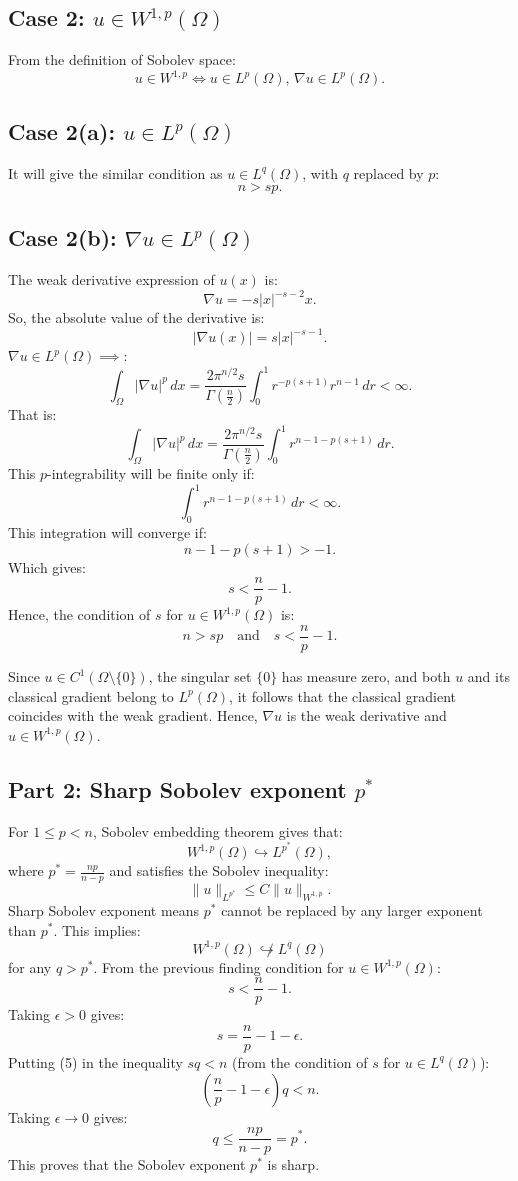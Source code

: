 \subsection{Case 2: $u\in W^{1,p}(\Omega)$}

From the definition of Sobolev space:
\[
u\in W^{1,p} \iff u\in L^p(\Omega), \, \nabla u\in L^p(\Omega).
\]

\subsection*{Case 2(a): $u\in L^p(\Omega)$}
It will give the similar condition as $u\in L^q(\Omega)$, with $q$ replaced by $p$:
\[
\boxed{
n>sp.
}
\]

\subsection*{Case 2(b): $\nabla u\in L^p(\Omega)$}
The weak derivative expression of $u(x)$ is:
\[
\nabla u = -s|x|^{-s-2}x.
\]
So, the absolute value of the derivative is:
\begin{equation}
    |\nabla u(x)| = s|x|^{-s-1}.
\end{equation}
$\nabla u\in L^p(\Omega) \implies$:
\[
\int_\Omega |\nabla u|^p \, dx = \frac{2\pi^{n/2}s}{\Gamma(\frac{n}{2})} \int_0^1 r^{-p(s+1)}r^{n-1} \, dr < \infty.
\]
That is:
\[
\int_\Omega |\nabla u|^p \, dx = \frac{2\pi^{n/2}s}{\Gamma(\frac{n}{2})} \int_0^1 r^{n-1-p(s+1)} \, dr.
\]
This $p$-integrability will be finite only if:
\[
\int_0^1 r^{n-1-p(s+1)} \, dr <\infty.
\]
This integration will converge if:
\[
n-1-p(s+1) > -1.
\]
Which gives:
\[
s < \frac{n}{p}-1.
\]
Hence, the condition of $s$ for $u \in W^{1,p}(\Omega)$ is:
\[
\boxed{
n> sp \quad \text{and} \quad s<\frac{n}{p}-1.
}
\]

Since $u\in C^1(\Omega\setminus\{0\})$, the singular set $\{0\}$ has measure zero, and both $u$ and its classical gradient belong to $L^p(\Omega)$, it follows that the classical gradient coincides with the weak gradient. Hence, $\nabla u$ is the weak derivative and $u\in W^{1,p}(\Omega)$.

\subsection{Part 2: Sharp Sobolev exponent $p^\ast$}
For $1\leq p < n$, Sobolev embedding theorem gives that:
\[
W^{1,p}(\Omega) \hookrightarrow L^{p^\ast}(\Omega),
\]
where $p^\ast=\frac{np}{n-p}$ and satisfies the Sobolev inequality:
\[
\|u\|_{L^{p^\ast}} \leq C\|u\|_{W^{1,p}}.
\]
Sharp Sobolev exponent means $p^\ast$ cannot be replaced by any larger exponent than $p^\ast$. This implies:
\[
W^{1,p}(\Omega) \not\hookrightarrow L^q(\Omega)
\]
for any $q>p^\ast$. 
From the previous finding condition for $u\in W^{1,p}(\Omega)$:
\[
s<\frac{n}{p}-1.
\]
Taking $\epsilon >0$ gives:
\begin{equation}
    s=\frac{n}{p}-1-\epsilon.
\end{equation}
Putting (5) in the inequality $sq<n$ (from the condition of $s$ for $u\in L^q(\Omega)$):
\[
\left(\frac{n}{p}-1-\epsilon \right)q < n.
\]
Taking $\epsilon \to 0$ gives:
\[
q \leq \frac{np}{n-p}=p^\ast.
\]
This proves that the Sobolev exponent $p^\ast$ is sharp.

